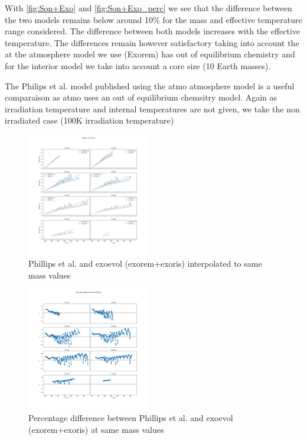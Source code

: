 With \cref{fig:Son+Exo} and \cref{fig:Son+Exo_perc} we see that the difference between the two models remains below around 10\% for the mass and effective temperature range considered. The difference between both models increases with the effective temperature. The differences remain however satisfactory taking into account the at the atmosphere model we use (Exorem) has out of equilibrium chemistry and for the interior model we take into account a core size (10 Earth masses). \par

The Philips et al. model \parencite{phillips_new_2020}  published using the atmo atmosphere model is a useful comparaison as atmo uses an out of equilibrium chemsitry model. Again as irradiation temperature and internal temperatures are not given, we take the non irradiated case (100K irradiation temperature)

\begin{figure}
    \centering
    \includegraphics[width=0.48\textwidth]{Images/comp_phillips.png}
    \caption{Phillips et al. and exoevol (exorem+exoris) interpolated to same mass values}
    \label{fig:Phil+Exo}
\end{figure}


\begin{figure}
    \centering
    \includegraphics[width=0.48\textwidth]{Images/perc_diff_phillips.png}
    \caption{Percentage difference between Phillips et al. and exoevol (exorem+exoris) at same mass values}
    \label{fig:Phil+Exo_perc}
\end{figure}

